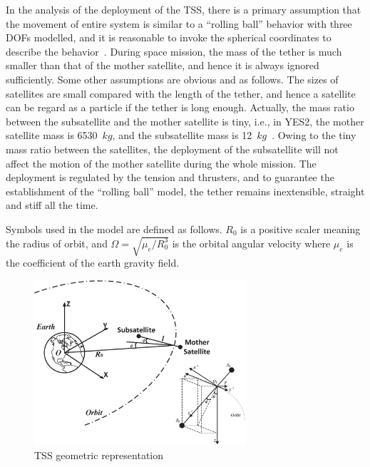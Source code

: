 \documentclass[3p]{elsarticle}
\theoremstyle{plain}
\theoremstyle{remark}
\begin{document}
In the analysis of the deployment of the TSS, there is a primary assumption that the movement of entire system is similar to a ``rolling ball'' behavior with three DOFs modelled, and it is reasonable to invoke the spherical coordinates to describe the behavior~\cite{Williams2008}. During space mission, the mass of the tether is much smaller than that of the mother satellite, and hence it is always ignored sufficiently. Some other assumptions are obvious and as follows. The sizes of satellites are small compared with the length of the tether, and hence a satellite can be regard as a particle if the tether is long enough. Actually, the mass ratio between the subsatellite and the mother satellite is tiny, i.e., in YES2, the mother satellite mass is 6530~$kg$, and the subsatellite mass is 12~$kg$~\cite{Williams2008}.  Owing to the tiny mass ratio between the satellites, the deployment of the subsatellite will not affect the motion of the mother satellite during the whole mission. The deployment is regulated by the tension and thrusters, and to guarantee the establishment of the ``rolling ball'' model, the tether remains inextensible, straight and stiff all the time.\par
Symbols used in the model are defined as follows. $R_0$ is a positive scaler meaning the radius of orbit, and $\Omega = \sqrt{\mu_e/R_0^3}$ is the orbital angular velocity where $\mu_e$ is the coefficient of the earth gravity field.\par
\begin{figure}[http]
\centering
\includegraphics[width=0.7\textwidth]{paper4_fig1.eps}
\caption{TSS geometric representation}
\label{fig:1}
\end{figure}
\end{document}
